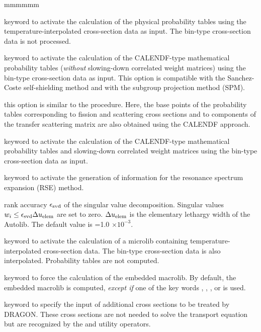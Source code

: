 \begin{ListeDeDescription}{mmmmmm}
\item[\moc{SUBG}] keyword to activate the calculation of the physical probability
tables using the tempera\-tu\-re-interpolated cross-section data as
input.\cite{subg,nse2004} The bin-type cross-section data is not processed.

\item[\moc{PT}] keyword to activate the calculation of the CALENDF-type
mathematical probability tables ({\sl without} slowing-down correlated weight matrices)
using the bin-type cross-section data as input.\cite{pt} This option is
compatible with the Sanchez-Coste self-shielding method and with the subgroup projection method (SPM).\cite{SPM09}

\item[\moc{PTMC}] this option is similar to the  procedure. Here, the base points of the probability tables corresponding
to fission and scattering cross sections and to components of the transfer scattering matrix are also obtained using the CALENDF approach.

\item[\moc{PTSL}] keyword to activate the calculation of the CALENDF-type
mathematical probability tables and slowing-down correlated weight matrices
using the bin-type cross-section data as input.\cite{nse2004}

\item[\moc{RSE}] keyword to activate the generation of information for the resonance spectrum expansion (RSE) method.\cite{rse2021}

\item[\dusa{svdeps}] rank accuracy $\epsilon_{\rm svd}$ of the singular value decomposition. Singular values $w_i \le \epsilon_{\rm svd}\Delta u_{\rm elem}$ are set to zero.
$\Delta u_{\rm elem}$ is the elementary lethargy width of the Autolib. The default value is =1.0 $\times 10^{-3}$.

\item[\moc{NEWL}] keyword to activate the calculation of a microlib
containing temperature-interpo\-la\-ted cross-section data. The bin-type
cross-section data is also interpolated. Probability tables are not computed.

\item[\moc{MACR}] keyword to force the calculation of the embedded
macrolib. By default, the embedded macrolib is computed, {\sl except if} one of the
key words , , ,  or  is used.

\item[\moc{ADED}] keyword to specify the input of additional cross sections to
be treated by DRAGON. These cross sections are not needed to solve the transport
equation but are recognized by the  and utility operators.


\end{ListeDeDescription}
